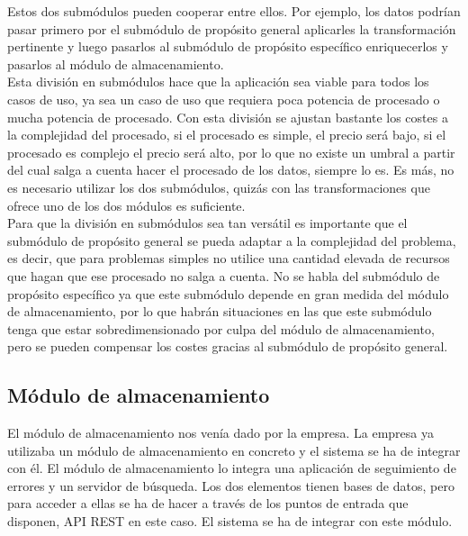 Estos dos submódulos pueden cooperar entre ellos. Por ejemplo, los datos podrían pasar primero por el submódulo de propósito general aplicarles la transformación pertinente y luego pasarlos al submódulo de propósito específico enriquecerlos y pasarlos al módulo de almacenamiento.
\\
Esta división en submódulos hace que la aplicación sea viable para todos los casos de uso, ya sea un caso de uso que requiera poca potencia de procesado o mucha potencia de procesado. Con esta división se ajustan bastante los costes a la complejidad del procesado, si el procesado es simple, el precio será bajo, si el procesado es complejo el precio será alto, por lo que no existe un umbral a partir del cual salga a cuenta hacer el procesado de los datos, siempre lo es. Es más, no es necesario utilizar los dos submódulos, quizás con las transformaciones que ofrece uno de los dos módulos es suficiente. 
\\
Para que la división en submódulos sea tan versátil es importante que el submódulo de propósito general se pueda adaptar a la complejidad del problema, es decir, que para problemas simples no utilice una cantidad elevada de recursos que hagan que ese procesado no salga a cuenta. No se habla del submódulo de propósito específico ya que este submódulo depende en gran medida del módulo de almacenamiento, por lo que habrán situaciones en las que este submódulo tenga que estar sobredimensionado por culpa del módulo de almacenamiento, pero se pueden compensar los costes gracias al submódulo de propósito general.



\subsection{Módulo de almacenamiento}
El módulo de almacenamiento nos venía dado por la empresa. La empresa ya utilizaba un módulo de almacenamiento en concreto y el sistema se ha de integrar con él. El módulo de almacenamiento lo integra una aplicación de seguimiento de errores y un servidor de búsqueda. Los dos elementos tienen bases de datos, pero para acceder a ellas se ha de hacer a través de los puntos de entrada que disponen, API REST en este caso. El sistema se ha de integrar con este módulo.
